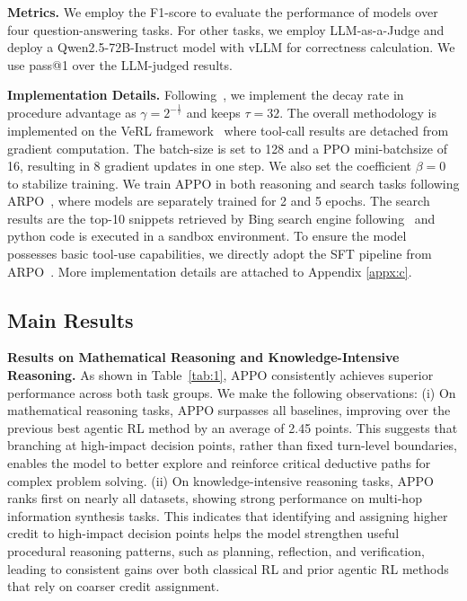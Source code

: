\documentclass{article}
\begin{document}
 

\noindent\textbf{Metrics.} We employ the F1-score to evaluate the performance of models over four question-answering tasks. For other tasks, we employ  LLM-as-a-Judge and deploy a Qwen2.5-72B-Instruct model with vLLM for correctness calculation. We use pass@1 over the LLM-judged results.   

\noindent\textbf{Implementation Details.}  Following~\cite{ma2026fipo}, we implement the decay rate in procedure advantage as $\gamma=2^{-\frac{1}{\tau}}$ and keeps $\tau=32$. The overall methodology is implemented on the VeRL framework~\cite{sheng2025hybridflow} where tool-call results are detached from gradient computation.  The batch-size is set to 128 and a PPO mini-batchsize of 16, resulting in 8 gradient updates in one step. We also set the coefficient $\beta=0$ to stabilize training. We train APPO in both reasoning and search tasks following ARPO~\cite{dong2025agentic}, where models are separately trained for 2 and 5 epochs. The search results are the top-10 snippets retrieved by Bing search engine following~\cite{jin2025flashrag,li2025retrollm,dong2025tool} and python code is executed in a sandbox environment. To ensure the model possesses basic tool-use capabilities, we directly adopt the SFT pipeline from ARPO~\cite{dong2025agentic}. More implementation details are attached to Appendix \ref{appx:c}. 

\subsection{Main Results}
\noindent\textbf{Results on Mathematical Reasoning and Knowledge-Intensive Reasoning.} 
As shown in Table~\ref{tab:1}, APPO consistently achieves superior performance across both task groups. 
We make the following observations: 
(i) On mathematical reasoning tasks, APPO surpasses all baselines, improving over the previous best agentic RL method by an average of 2.45 points. This suggests that branching at high-impact decision points, rather than fixed turn-level boundaries, enables the model to better explore and reinforce critical deductive paths for complex problem solving. (ii) On knowledge-intensive reasoning tasks, APPO ranks first on nearly all datasets, showing strong performance on multi-hop information synthesis tasks. This indicates that identifying and assigning higher credit to high-impact decision points helps the model strengthen useful procedural reasoning patterns, such as planning, reflection, and verification, leading to consistent gains over both classical RL and prior agentic RL methods that rely on coarser credit assignment.
\end{document}
